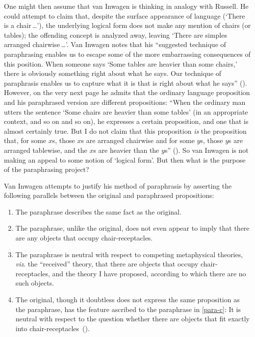 \documentclass[11pt]{article}
\begin{document}
\begin{spacing}{1.5}
One might then assume that van Inwagen is thinking in analogy with
Russell.  He could attempt to claim that, despite the surface
appearance of language (`There is a chair\,\ldots '), the underlying
logical form does not make any mention of chairs (or tables); the
offending concept is analyzed away, leaving `There are simples
arranged chairwise\,\ldots '.  Van Inwagen notes that his ``suggested
technique of paraphrasing enables us to escape some of the more
embarrassing consequences of this position.  When someone says `Some
tables are heavier than some chairs,' there is obviously something
right about what he says.  Our technique of paraphrasis enables us to
capture what it is that is right about what he says''
(\citeyear[111]{inwagen1995}).  However, on the very next page he
admits that the ordinary language proposition and his paraphrased
version are different propositions: ``When the ordinary man utters the
sentence `Some chairs are heavier than some tables' (in an appropriate
context, and so on and so on), he expresses a certain proposition, and
one that is almost certainly true.  But I do not claim that this
proposition {\em is} the proposition that, for some $x$s, those $x$s
are arranged chairwise and for some $y$s, those $y$s are arranged
tablewise, and the $x$s are heavier than the $y$s''
(\citeyear[112]{inwagen1995}).  So van Inwagen is not making an appeal
to some notion of `logical form'.  But then what is the purpose of the
paraphrasing project?

Van Inwagen attempts to justify his method of paraphrasis by asserting
the following parallels between the original and paraphrased
propositions:
\begin{enumerate}[label=(\Alph*)]
	\item The paraphrase describes the same fact as the
          original.  \label{para-a}
	\item The paraphrase, unlike the original, does not even
          appear to imply that there are any objects that occupy
          chair-receptacles.  \label{para-b}
	\item The paraphrase is neutral with respect to competing
          metaphysical theories, {\em viz}.  the ``received'' theory,
          that there are objects that occupy chair-receptacles, and
          the theory I have proposed, according to which there are no
          such objects.  \label{para-c}
	\item The original, though it doubtless does not express the
          same proposition as the paraphrase, has the feature ascribed
          to the paraphrase in \ref{para-c}: It is neutral with
          respect to the question whether there are objects that fit
          exactly into
          chair-receptacles~(\citeyear[113]{inwagen1995}).  \label{para-d}
\end{enumerate}


\end{spacing}
\end{document}
